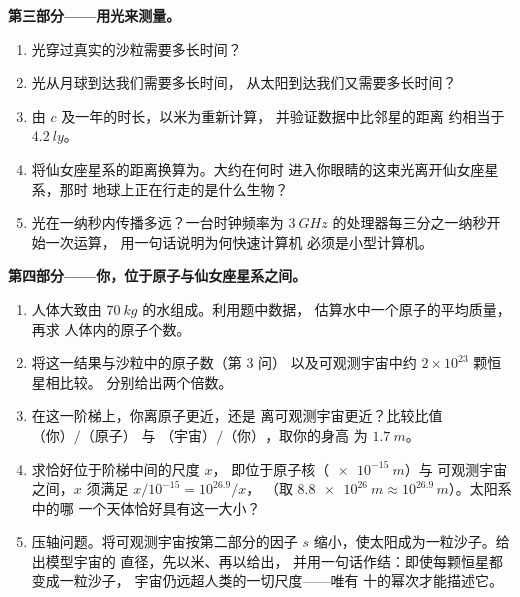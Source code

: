 \begin{problem}
\medskip
\noindent\textbf{第三部分——用光来测量。}
\begin{enumerate}[resume]
  \item 光穿过真实的沙粒需要多长时间？
  \item 光从月球到达我们需要多长时间，
        从太阳到达我们又需要多长时间？
  \item 由 $c$ 及一年的时长，以米为重新计算，
        并验证数据中比邻星的距离
        约相当于 $\qty{4.2}{ly}$。
  \item 将仙女座星系的距离换算为。大约在何时
        进入你眼睛的这束光离开仙女座星系，那时
        地球上正在行走的是什么生物？
  \item 光在一纳秒内传播多远？一台时钟频率为
        $\qty{3}{GHz}$ 的处理器每三分之一纳秒开始一次运算，
        用一句话说明为何快速计算机
        必须是小型计算机。
\end{enumerate}

\medskip
\noindent\textbf{第四部分——你，位于原子与仙女座星系之间。}
\begin{enumerate}[resume]
  \item 人体大致由 $\qty{70}{kg}$ 的水组成。利用题中数据，
        估算水中一个原子的平均质量，再求
        人体内的原子个数。
  \item 将这一结果与沙粒中的原子数（第 3 问）
        以及可观测宇宙中约 $2\times10^{23}$ 颗恒星相比较。
        分别给出两个倍数。
  \item 在这一阶梯上，你离原子更近，还是
        离可观测宇宙更近？比较比值 $\text{（你）}/\text{（原子）}$ 与
        $\text{（宇宙）}/\text{（你）}$，取你的身高
        为 $\qty{1.7}{m}$。
  \item 求恰好位于阶梯中间的尺度 $x$，
        即位于原子核（$\qty{e-15}{m}$）与
        可观测宇宙之间，$x$ 须满足 $x / 10^{-15} = 10^{26.9} / x$，
        （取 $\qty{8.8e26}{m} \approx 10^{26.9}\,\unit{m}$）。太阳系中的哪
        一个天体恰好具有这一大小？
  \item 压轴问题。将可观测宇宙按第二部分的因子
        $s$ 缩小，使太阳成为一粒沙子。给出模型宇宙的
        直径，先以米、再以给出，
        并用一句话作结：即使每颗恒星都变成一粒沙子，
        宇宙仍远超人类的一切尺度——唯有
        十的幂次才能描述它。
\end{enumerate}
\end{problem}
